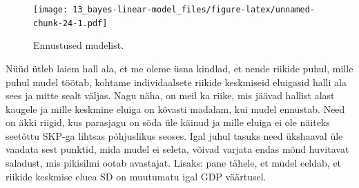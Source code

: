 \documentclass[]{book}
\newenvironment{Shaded}{\begin{snugshade}}{\end{snugshade}}
\newcommand{\CharTok}[1]{\textcolor[rgb]{0.31,0.60,0.02}{#1}}
\newcommand{\CommentTok}[1]{\textcolor[rgb]{0.56,0.35,0.01}{\textit{#1}}}
\newcommand{\DataTypeTok}[1]{\textcolor[rgb]{0.13,0.29,0.53}{#1}}
\newcommand{\DecValTok}[1]{\textcolor[rgb]{0.00,0.00,0.81}{#1}}
\newcommand{\FloatTok}[1]{\textcolor[rgb]{0.00,0.00,0.81}{#1}}
\newcommand{\KeywordTok}[1]{\textcolor[rgb]{0.13,0.29,0.53}{\textbf{#1}}}
\newcommand{\NormalTok}[1]{#1}
\newcommand{\OperatorTok}[1]{\textcolor[rgb]{0.81,0.36,0.00}{\textbf{#1}}}
\newcommand{\OtherTok}[1]{\textcolor[rgb]{0.56,0.35,0.01}{#1}}
\newcommand{\StringTok}[1]{\textcolor[rgb]{0.31,0.60,0.02}{#1}}
\begin{document}
\begin{Shaded}
\end{Shaded}

\begin{figure}
\centering
\texttt{[image: 13\_bayes-linear-model\_files/figure-latex/unnamed-chunk-24-1.pdf]}
\caption{\label{fig:unnamed-chunk-24}Ennustused mudelist.}
\end{figure}

Nüüd ütleb laiem hall ala, et me oleme üsna kindlad, et nende riikide puhul, mille puhul mudel töötab, kohtame individaalsete riikide keskmiseid eluigasid halli ala sees ja mitte sealt väljas.
Nagu näha, on meil ka riike, mis jäävad hallist alast kaugele ja mille keskmine eluiga on kõvasti madalam, kui mudel ennustab.
Need on äkki riigid, kus parasjagu on sõda üle käinud ja mille eluiga ei ole näiteks seetõttu SKP-ga lihtsas põhjuslikus seoses.
Igal juhul tasuks need ükshaaval üle vaadata sest punktid, mida mudel ei seleta, võivad varjata endas mõnd huvitavat saladust, mis pikisilmi ootab avastajat.
Lisaks: pane tähele, et mudel eeldab, et riikide keskmise eluea SD on muutumatu igal GDP väärtusel.
\end{document}
